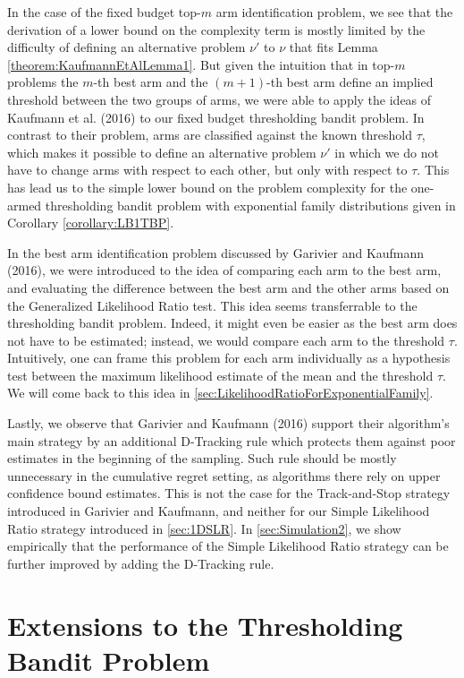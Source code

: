 \documentclass[11pt,]{article}
\begin{document}
In the case of the fixed budget top-\(m\) arm identification problem, we
see that the derivation of a lower bound on the complexity term is
mostly limited by the difficulty of defining an alternative problem
\(\nu'\) to \(\nu\) that fits Lemma \ref{theorem:KaufmannEtAlLemma1}.
But given the intuition that in top-\(m\) problems the \(m\)-th best arm
and the \((m+1)\)-th best arm define an implied threshold between the
two groups of arms, we were able to apply the ideas of Kaufmann et al.
(2016) to our fixed budget thresholding bandit problem. In contrast to
their problem, arms are classified against the known threshold \(\tau\),
which makes it possible to define an alternative problem \(\nu'\) in
which we do not have to change arms with respect to each other, but only
with respect to \(\tau\). This has lead us to the simple lower bound on
the problem complexity for the one-armed thresholding bandit problem
with exponential family distributions given in Corollary
\ref{corollary:LB1TBP}.

In the best arm identification problem discussed by Garivier and
Kaufmann (2016), we were introduced to the idea of comparing each arm to
the best arm, and evaluating the difference between the best arm and the
other arms based on the Generalized Likelihood Ratio test. This idea
seems transferrable to the thresholding bandit problem. Indeed, it might
even be easier as the best arm does not have to be estimated; instead,
we would compare each arm to the threshold \(\tau\). Intuitively, one
can frame this problem for each arm individually as a hypothesis test
between the maximum likelihood estimate of the mean and the threshold
\(\tau\). We will come back to this idea in
\autoref{sec:LikelihoodRatioForExponentialFamily}.

Lastly, we observe that Garivier and Kaufmann (2016) support their
algorithm's main strategy by an additional D-Tracking rule which
protects them against poor estimates in the beginning of the sampling.
Such rule should be mostly unnecessary in the cumulative regret setting,
as algorithms there rely on upper confidence bound estimates. This is
not the case for the Track-and-Stop strategy introduced in Garivier and
Kaufmann, and neither for our Simple Likelihood Ratio strategy
introduced in \autoref{sec:1DSLR}. In \autoref{sec:Simulation2}, we show
empirically that the performance of the Simple Likelihood Ratio strategy
can be further improved by adding the D-Tracking rule.

\newpage

\section{\texorpdfstring{Extensions to the Thresholding Bandit Problem
\label{chap:Extensions}}{Extensions to the Thresholding Bandit Problem }}\label{extensions-to-the-thresholding-bandit-problem}
\end{document}
